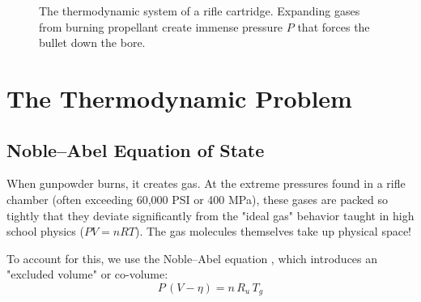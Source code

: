\documentclass[11pt,twoside,openright]{report}
\begin{document}
\begin{figure}[H]
\centering
{}
\caption{The thermodynamic system of a rifle cartridge. Expanding gases from burning propellant create immense pressure $P$ that forces the bullet down the bore.}
\label{fig:interior_chamber}
\end{figure}

\section{The Thermodynamic Problem}

\subsection{Noble--Abel Equation of State}

When gunpowder burns, it creates gas. At the extreme pressures found in a rifle chamber (often exceeding 60,000 PSI or 400 MPa), these gases are packed so tightly that they deviate significantly from the "ideal gas" behavior taught in high school physics ($PV = nRT$). The gas molecules themselves take up physical space!

To account for this, we use the Noble--Abel equation \citep{corner1950interior,carlucci2007ballistics}, which introduces an "excluded volume" or co-volume:
\begin{equation}
  P\,(V - \eta) = n\,R_u\,T_g
  \label{eq:nobel_abel}
\end{equation}
\end{document}
